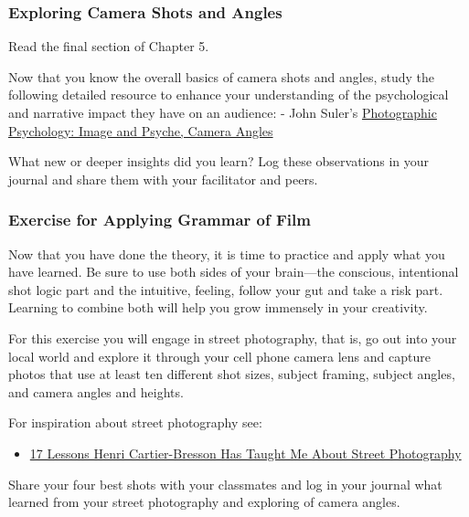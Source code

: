 \documentclass[
]{book}
\providecommand{\tightlist}{%
  \setlength{\itemsep}{0pt}\setlength{\parskip}{0pt}}
\begin{document}
\begin{reflect}
\hypertarget{exploring-camera-shots-and-angles}{%
\subsubsection*{Exploring Camera Shots and Angles}\label{exploring-camera-shots-and-angles}}

Read the final section of Chapter 5.

Now that you know the overall basics of camera shots and angles, study the following detailed resource to enhance your understanding of the psychological and narrative impact they have on an audience:
- John Suler's \href{http://truecenterpublishing.com/photopsy/camera_angles.htm}{Photographic Psychology: Image and Psyche, Camera Angles}

What new or deeper insights did you learn? Log these observations in your journal and share them with your facilitator and peers.

\hypertarget{exercise-for-applying-grammar-of-film}{%
\subsubsection*{Exercise for Applying Grammar of Film}\label{exercise-for-applying-grammar-of-film}}

Now that you have done the theory, it is time to practice and apply what you have learned. Be sure to use both sides of your brain---the conscious, intentional shot logic part and the intuitive, feeling, follow your gut and take a risk part. Learning to combine both will help you grow immensely in your creativity.

For this exercise you will engage in street photography, that is, go out into your local world and explore it through your cell phone camera lens and capture photos that use at least ten different shot sizes, subject framing, subject angles, and camera angles and heights.

For inspiration about street photography see:

\begin{itemize}
\tightlist
\item
  \href{https://erickimphotography.com/blog/2014/12/09/17-lessons-henri-cartier-bresson-taught-street-photography/}{17 Lessons Henri Cartier-Bresson Has Taught Me About Street Photography}
\end{itemize}

Share your four best shots with your classmates and log in your journal what learned from your street photography and exploring of camera angles.
\end{reflect}
\end{document}
